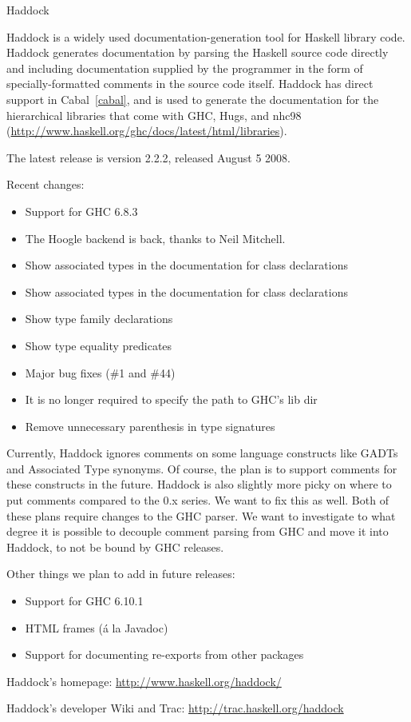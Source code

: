 \begin{hcarentry}{Haddock}
\label{haddock}
\makeheader

Haddock is a widely used documentation-generation tool for Haskell
library code.  Haddock generates documentation by parsing the Haskell
source code directly and including documentation supplied by the
programmer in the form of specially-formatted comments in the source
code itself.  Haddock has direct support in Cabal~\cref{cabal}, and is used to
generate the documentation for the hierarchical libraries that come
with GHC, Hugs, and nhc98
(\url{http://www.haskell.org/ghc/docs/latest/html/libraries}).

The latest release is version 2.2.2, released August 5 2008.

\Separate
Recent changes:
\begin{itemize}
\item Support for GHC 6.8.3
\item The Hoogle backend is back, thanks to Neil Mitchell.
\item Show associated types in the documentation for class declarations
\item Show associated types in the documentation for class declarations
\item Show type family declarations
\item Show type equality predicates
\item Major bug fixes (\#1 and \#44)
\item It is no longer required to specify the path to GHC's lib dir
\item Remove unnecessary parenthesis in type signatures
\end{itemize}

\FuturePlans
Currently, Haddock ignores comments on some language constructs like GADTs and
Associated Type synonyms. Of course, the plan is to support comments
for these constructs in the future.
Haddock is also slightly more picky on where to put comments compared
to the 0.x series. We want to fix this
as well. Both of these plans require changes to the GHC parser. We
want to investigate to what degree it is possible to
decouple comment parsing from GHC and move it into Haddock, to not be bound by
GHC releases.

Other things we plan to add in future releases:
\begin{itemize}
\item Support for GHC 6.10.1
\item HTML frames ({\'a} la Javadoc)
\item Support for documenting re-exports from other packages 
\end{itemize}

\FurtherReading
\begin{compactitem}
\item Haddock's homepage:
\url{http://www.haskell.org/haddock/}

\item Haddock's developer Wiki and Trac:
\url{http://trac.haskell.org/haddock}
\end{compactitem}
\end{hcarentry}
